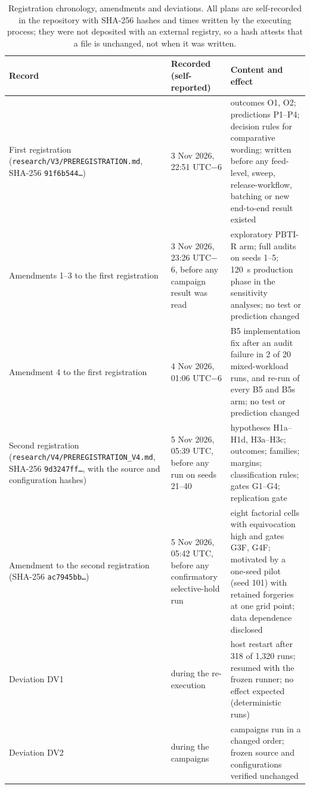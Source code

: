 \documentclass[10pt,a4paper]{article}
\begin{document}
\begin{table}[!htbp]
\caption{Registration chronology, amendments and deviations. All plans are self-recorded in the repository with SHA-256 hashes and times written by the executing process; they were not deposited with an external registry, so a hash attests that a file is unchanged, not when it was written.\label{tab:S-chronology}}
\footnotesize
\begin{tabularx}{\linewidth}{p{3.2cm}p{2.9cm}X}
\toprule
\textbf{Record} & \textbf{Recorded (self-reported)} & \textbf{Content and effect}\\
\midrule
First registration (\texttt{research/\allowbreak{}V3/\allowbreak{}PREREGISTRATION.md}, SHA-256 \texttt{91f6b544\ldots}) & 3 Nov 2026, 22:51 UTC$-$6 & outcomes O1, O2; predictions P1--P4; decision rules for comparative wording; written before any feed-level, sweep, release-workflow, batching or new end-to-end result existed\\
Amendments 1--3 to the first registration & 3 Nov 2026, 23:26 UTC$-$6, before any campaign result was read & exploratory PBTI-R arm; full audits on seeds 1--5; 120~s production phase in the sensitivity analyses; no test or prediction changed\\
Amendment 4 to the first registration & 4 Nov 2026, 01:06 UTC$-$6 & B5 implementation fix after an audit failure in 2 of 20 mixed-workload runs, and re-run of every B5 and B5s arm; no test or prediction changed\\
Second registration (\texttt{research/\allowbreak{}V4/\allowbreak{}PREREGISTRATION\_\allowbreak{}V4.md}, SHA-256 \texttt{9d3247ff\ldots}, with the source and configuration hashes) & 5 Nov 2026, 05:39 UTC, before any run on seeds 21--40 & hypotheses H1a--H1d, H3a--H3c; outcomes; families; margins; classification rules; gates G1--G4; replication gate\\
Amendment to the second registration (SHA-256 \texttt{ac7945bb\ldots}) & 5 Nov 2026, 05:42 UTC, before any confirmatory selective-hold run & eight factorial cells with equivocation high and gates G3F, G4F; motivated by a one-seed pilot (seed 101) with retained forgeries at one grid point; data dependence disclosed\\
Deviation DV1 & during the re-execution & host restart after 318 of 1{,}320 runs; resumed with the frozen runner; no effect expected (deterministic runs)\\
Deviation DV2 & during the campaigns & campaigns run in a changed order; frozen source and configurations verified unchanged\\

\end{tabularx}
\end{table}
\end{document}
